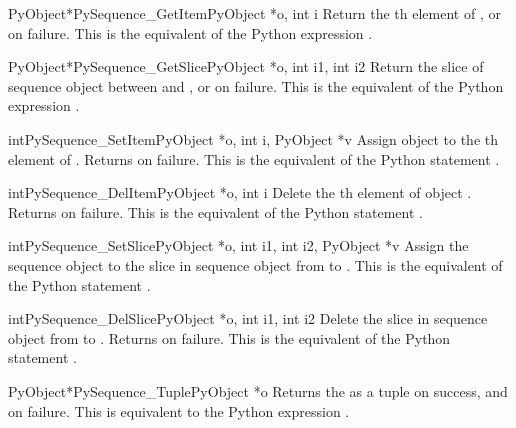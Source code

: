 \documentclass{manual}
\begin{document}
\begin{cfuncdesc}{PyObject*}{PySequence_GetItem}{PyObject *o, int i}
Return the th element of , or \NULL{} on failure. This
is the equivalent of the Python expression .
\end{cfuncdesc}


\begin{cfuncdesc}{PyObject*}{PySequence_GetSlice}{PyObject *o, int i1, int i2}
Return the slice of sequence object  between  and
, or \NULL{} on failure. This is the equivalent of the Python
expression .
\end{cfuncdesc}


\begin{cfuncdesc}{int}{PySequence_SetItem}{PyObject *o, int i, PyObject *v}
Assign object  to the th element of .
Returns  on failure.  This is the equivalent of the Python
statement .
\end{cfuncdesc}

\begin{cfuncdesc}{int}{PySequence_DelItem}{PyObject *o, int i}
Delete the th element of object .  Returns
 on failure.  This is the equivalent of the Python
statement .
\end{cfuncdesc}

\begin{cfuncdesc}{int}{PySequence_SetSlice}{PyObject *o, int i1,
                                            int i2, PyObject *v}
Assign the sequence object  to the slice in sequence
object  from  to .  This is the equivalent of
the Python statement .
\end{cfuncdesc}

\begin{cfuncdesc}{int}{PySequence_DelSlice}{PyObject *o, int i1, int i2}
Delete the slice in sequence object  from  to .
Returns  on failure. This is the equivalent of the Python
statement .
\end{cfuncdesc}

\begin{cfuncdesc}{PyObject*}{PySequence_Tuple}{PyObject *o}
Returns the  as a tuple on success, and \NULL{} on failure.
This is equivalent to the Python expression .
\end{cfuncdesc}
\end{document}
